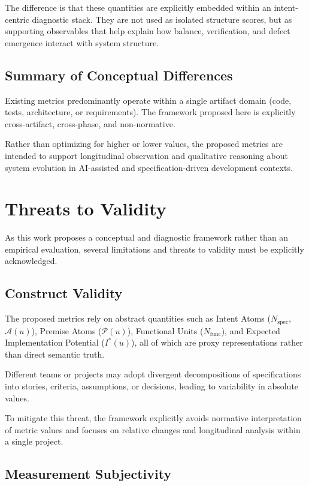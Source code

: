 \documentclass[twocolumn]{aastex701}
\begin{document}
The difference is that these quantities are explicitly embedded
within an intent-centric diagnostic stack.
They are not used as isolated structure scores,
but as supporting observables that help explain how balance,
verification, and defect emergence interact with system structure.

\subsection{Summary of Conceptual Differences}

Existing metrics predominantly operate within a single artifact domain
(code, tests, architecture, or requirements).
The framework proposed here is explicitly cross-artifact,
cross-phase, and non-normative.

Rather than optimizing for higher or lower values,
the proposed metrics are intended to support longitudinal observation
and qualitative reasoning about system evolution in AI-assisted
and specification-driven development contexts.

\section{Threats to Validity}

As this work proposes a conceptual and diagnostic framework rather than
an empirical evaluation, several limitations and threats to validity
must be explicitly acknowledged.

\subsection{Construct Validity}

The proposed metrics rely on abstract quantities such as Intent Atoms
($N_{\mathrm{spec}}$, $\mathcal{A}(u)$),
Premise Atoms ($\mathcal{P}(u)$),
Functional Units ($N_{\mathrm{func}}$),
and Expected Implementation Potential ($I^\ast(u)$),
all of which are proxy representations rather than direct semantic truth.

Different teams or projects may adopt divergent decompositions of
specifications into stories, criteria, assumptions, or decisions,
leading to variability in absolute values.

To mitigate this threat, the framework explicitly avoids normative
interpretation of metric values and focuses on relative changes
and longitudinal analysis within a single project.

\subsection{Measurement Subjectivity}
\end{document}
